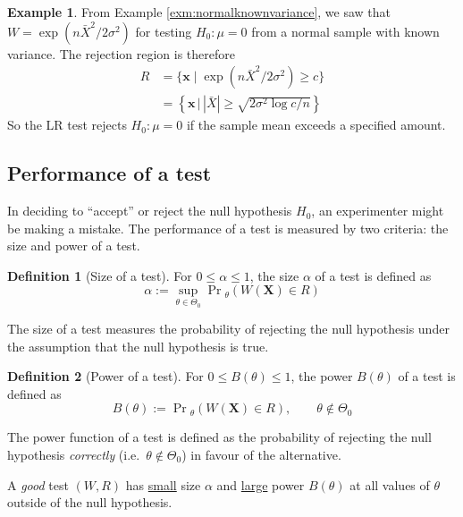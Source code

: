 \documentclass[
]{book}
\newcommand{\bx}{{\boldsymbol x}}
\newcommand{\bX}{{\boldsymbol X}}
\theoremstyle{definition}
\newtheorem{definition}{Definition}[chapter]
\theoremstyle{definition}
\newtheorem{example}{Example}[chapter]
\theoremstyle{definition}
\theoremstyle{definition}
\theoremstyle{remark}
\begin{document}
\begin{example}
\protect\hypertarget{exm:normalrejregion}{}\label{exm:normalrejregion}From Example \ref{exm:normalknownvariance}, we saw that \(W = \exp(n\bar X^2/2\sigma^2)\) for testing \(H_0:\mu=0\) from a normal sample with known variance. The rejection region is therefore
\begin{align*}
R 
&= \{\bx \mid \exp(n\bar X^2/2\sigma^2) \geq c \} \\
&=  \left\{\bx \,\Big|\, |\bar X| \geq \sqrt {2\sigma^2\log c /n} \right\} 
\end{align*}
So the LR test rejects \(H_0:\mu=0\) if the sample mean exceeds a specified amount.
\end{example}

\hypertarget{performance-of-a-test}{%
\subsection{Performance of a test}\label{performance-of-a-test}}

In deciding to ``accept'' or reject the null hypothesis \(H_0\), an experimenter might be making a mistake.
The performance of a test is measured by two criteria: the size and power of a test.

\begin{definition}[Size of a test]
For \(0\leq\alpha\leq 1\), the size \(\alpha\) of a test is defined as
\[
\alpha := \sup_{\theta\in\Theta_0} \Pr\!{}_\theta\left( W(\bX) \in R \right)
\]
\end{definition}

The size of a test measures the probability of rejecting the null hypothesis under the assumption that the null hypothesis is true.

\begin{definition}[Power of a test]
For \(0\leq B(\theta)\leq 1\), the power \(B(\theta)\) of a test is defined as
\[
B(\theta) :=  \Pr\!{}_\theta\left( W(\bX) \in R \right), \hspace{2em} \theta\not\in\Theta_0
\]
\end{definition}

The power function of a test is defined as the probability of rejecting the null hypothesis \emph{correctly} (i.e.~\(\theta\not\in\Theta_0\)) in favour of the alternative.

A \emph{good} test \((W,R)\) has \underline{small} size \(\alpha\) and \underline{large} power \(B(\theta)\) at all values of \(\theta\) outside of the null hypothesis.
\end{document}
